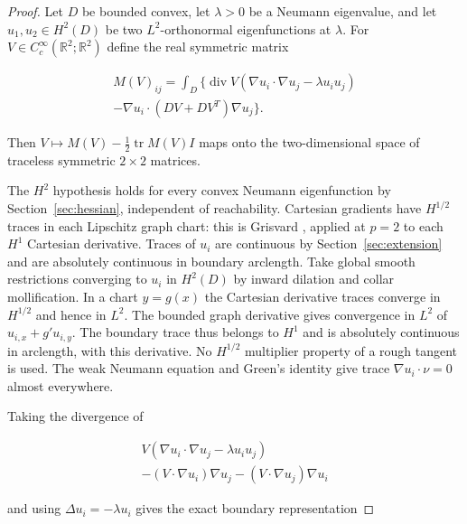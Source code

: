 \documentclass[11pt]{article}
\theoremstyle{definition}
\theoremstyle{remark}
\numberwithin{equation}{section}
\begin{document}
\begin{proof}

Let $D$ be bounded convex, let $\lambda>0$ be a Neumann eigenvalue, and let $u_1,u_2\in H^2(D)$ be two $L^2$-orthonormal eigenfunctions at $\lambda$. For $V\in C_c^\infty(\mathbb R^2;\mathbb R^2)$ define the real symmetric matrix

\begin{equation}\label{eq:src-11-01}
\begin{gathered}
M(V)_{ij}=\int_D\{\operatorname{div}V(\nabla u_i\cdot\nabla u_j-\lambda u_iu_j) \\
-\nabla u_i\cdot(DV+DV^T)\nabla u_j\}.
\end{gathered}
\end{equation}

Then $V\mapsto M(V)-\tfrac12\operatorname{tr}M(V)I$ maps onto the two-dimensional space of traceless symmetric $2\times2$ matrices.

The $H^2$ hypothesis holds for every convex Neumann eigenfunction by Section~\ref{sec:hessian}, independent of reachability. Cartesian gradients have $H^{1/2}$ traces in each Lipschitz graph chart: this is Grisvard \cite[Theorem~1.5.1.3, p.~38]{Grisvard}, applied at $p=2$ to each $H^1$ Cartesian derivative. Traces of $u_i$ are continuous by Section~\ref{sec:extension} and are absolutely continuous in boundary arclength. Take global smooth restrictions converging to $u_i$ in $H^2(D)$ by inward dilation and collar mollification. In a chart $y=g(x)$ the Cartesian derivative traces converge in $H^{1/2}$ and hence in $L^2$. The bounded graph derivative gives convergence in $L^2$ of $u_{i,x}+g' u_{i,y}$. The boundary trace thus belongs to $H^1$ and is absolutely continuous in arclength, with this derivative. No $H^{1/2}$ multiplier property of a rough tangent is used. The weak Neumann equation and Green's identity give trace $\nabla u_i\cdot\nu=0$ almost everywhere.

Taking the divergence of

\begin{equation}\label{eq:src-11-02}
\begin{gathered}
V(\nabla u_i\cdot\nabla u_j-\lambda u_iu_j) \\
-(V\cdot\nabla u_i)\nabla u_j-(V\cdot\nabla u_j)\nabla u_i
\end{gathered}
\end{equation}

and using $\Delta u_i=-\lambda u_i$ gives the exact boundary representation


\end{proof}
\end{document}
